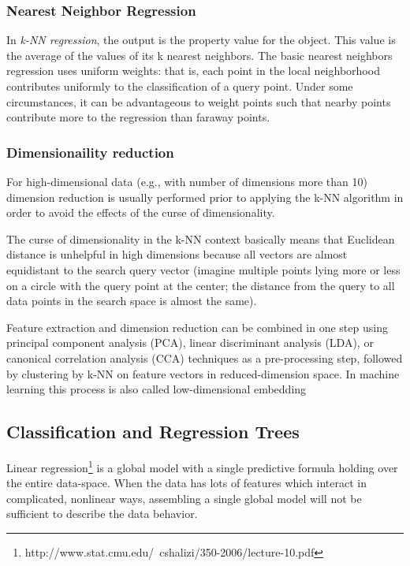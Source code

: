 \documentclass[11pt]{article}
\theoremstyle{plain}
\theoremstyle{definition}
\begin{document}
\subsubsection{Nearest Neighbor Regression}
In \textit{k-NN regression}, the output is the property value for the object. This value is the average of the values of its k nearest neighbors. The basic nearest neighbors regression uses uniform weights: that is, each point in the local neighborhood contributes uniformly to the classification of a query point. Under some circumstances, it can be advantageous to weight points such that nearby points contribute more to the regression than faraway points. 



\subsubsection{Dimensionaility reduction}
For high-dimensional data (e.g., with number of dimensions more than 10) dimension reduction is usually performed prior to applying the k-NN algorithm in order to avoid the effects of the curse of dimensionality.

The curse of dimensionality in the k-NN context basically means that Euclidean distance is unhelpful in high dimensions because all vectors are almost equidistant to the search query vector (imagine multiple points lying more or less on a circle with the query point at the center; the distance from the query to all data points in the search space is almost the same).

Feature extraction and dimension reduction can be combined in one step using principal component analysis (PCA), linear discriminant analysis (LDA), or canonical correlation analysis (CCA) techniques as a pre-processing step, followed by clustering by k-NN on feature vectors in reduced-dimension space. In machine learning this process is also called low-dimensional embedding

\subsection{Classification and Regression Trees}
Linear regression\footnote{http://www.stat.cmu.edu/~cshalizi/350-2006/lecture-10.pdf} is a global model with a single predictive formula
holding over the entire data-space. When the data has lots of features
which interact in complicated, nonlinear ways, assembling a single global model
will not be sufficient to describe the data behavior. 
\end{document}
